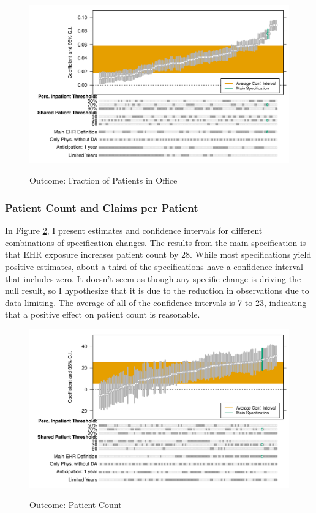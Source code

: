 \documentclass[12pt]{article}
\begin{document}
\begin{figure}[ht]
    \centering
    \caption{Outcome: Fraction of Patients in Office}
    \includegraphics[scale=.7]{Objects/office_frac_chart.pdf}
    \label{fig:fracoffice_chart}
\end{figure}


\subsubsection{Patient Count and Claims per Patient}

In Figure \ref{fig:pat_chart}, I present estimates and confidence intervals for different combinations of specification changes. The results from the main specification is that EHR exposure increases patient count by 28. While most specifications yield positive estimates, about a third of the specifications have a confidence interval that includes zero. It doesn't seem as though any specific change is driving the null result, so I hypothesize that it is due to the reduction in observations due to data limiting. The average of all of the confidence intervals is 7 to 23, indicating that a positive effect on patient count is reasonable. 

\begin{figure}[ht]
    \centering
    \caption{Outcome: Patient Count}
    \includegraphics[scale=.7]{Objects/patient_chart.pdf}
    \label{fig:pat_chart}
\end{figure}
\end{document}
